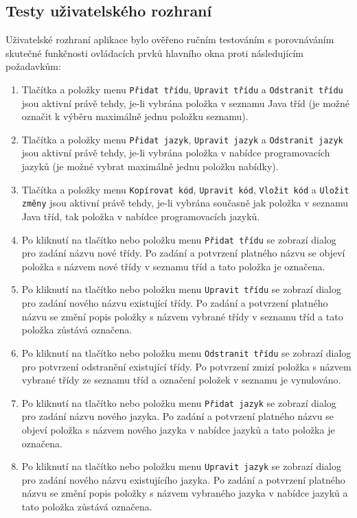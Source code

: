 \documentclass[onepage, a4paper, 12pt]{bakalarka}
\begin{document}
\subsection{Testy uživatelského rozhraní}
Uživatelské rozhraní aplikace bylo ověřeno ručním testováním s porovnáváním skutečné funkčnosti ovládacích prvků hlavního okna proti následujícím požadavkům:
\begin{enumerate}
\item{Tlačítka a položky menu \texttt{Přidat třídu}, \texttt{Upravit třídu} a \texttt{Odstranit třídu} jsou aktivní právě tehdy, je-li vybrána položka v seznamu Java tříd (je možné označit k výběru maximálně jednu položku seznamu).}
\item{Tlačítka a položky menu \texttt{Přidat jazyk}, \texttt{Upravit jazyk} a \texttt{Odstranit jazyk} jsou aktivní právě tehdy, je-li vybrána položka v nabídce programovacích jazyků (je možné vybrat maximálně jednu položku nabídky).}
\item{Tlačítka a položky menu \texttt{Kopírovat kód}, \texttt{Upravit kód}, \texttt{Vložit kód} a \texttt{Uložit změny} jsou aktivní právě tehdy, je-li vybrána současně jak položka v seznamu Java tříd, tak položka v nabídce programovacích jazyků.}
\item{Po kliknutí na tlačítko nebo položku menu \texttt{Přidat třídu} se zobrazí dialog pro zadání názvu nové třídy. Po zadání a potvrzení platného názvu se objeví položka s názvem nové třídy v seznamu tříd a tato položka je označena.}
\item{Po kliknutí na tlačítko nebo položku menu \texttt{Upravit třídu} se zobrazí dialog pro zadání nového názvu existující třídy. Po zadání a potvrzení platného názvu se změní popis položky s názvem vybrané třídy v seznamu tříd a tato položka zůstává označena.}
\item{Po kliknutí na tlačítko nebo položku menu \texttt{Odstranit třídu} se zobrazí dialog pro potvrzení odstranění existující třídy. Po potvrzení zmizí položka s názvem vybrané třídy ze seznamu tříd a označení položek v seznamu je vynulováno.}
\item{Po kliknutí na tlačítko nebo položku menu \texttt{Přidat jazyk} se zobrazí dialog pro zadání názvu nového jazyka. Po zadání a potvrzení platného názvu se objeví položka s názvem nového jazyka v nabídce jazyků a tato položka je označena.}
\item{Po kliknutí na tlačítko nebo položku menu \texttt{Upravit jazyk} se zobrazí dialog pro zadání nového názvu existujícího jazyka. Po zadání a potvrzení platného názvu se změní popis položky s názvem vybraného jazyka v nabídce jazyků a tato položka zůstává označena.}

\end{enumerate}
\end{document}
